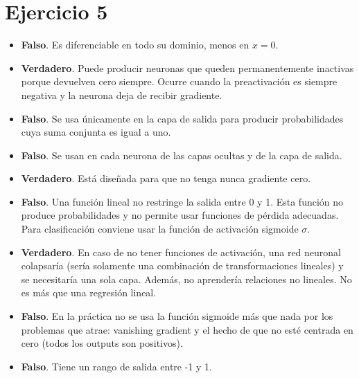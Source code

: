 \documentclass[12pt, a4paper]{article}
\begin{document}
    \section*{Ejercicio 5}
        \begin{itemize}
            \item \textbf{Falso}. Es diferenciable en todo su dominio, menos en \(x = 0\).
            \item \textbf{Verdadero}. Puede producir neuronas que queden permanentemente inactivas porque devuelven cero siempre. Ocurre cuando la preactivación es siempre negativa y la neurona deja de recibir gradiente.
            \item \textbf{Falso}. Se usa únicamente en la capa de salida para producir probabilidades cuya suma conjunta es igual a uno.
            \item \textbf{Falso}. Se usan en cada neurona de las capas ocultas y de la capa de salida.
            \item \textbf{Verdadero}. Está diseñada para que no tenga nunca gradiente cero.
            \item \textbf{Falso}. Una función lineal no restringe la salida entre 0 y 1. Esta función no produce probabilidades y no permite usar funciones de pérdida adecuadas. Para clasificación conviene usar la función de activación sigmoide $\sigma$.
            \item \textbf{Verdadero}. En caso de no tener funciones de activación, una red neuronal colapsaría (sería solamente una combinación de transformaciones lineales) y se necesitaría una sola capa. Además, no aprendería relaciones no lineales. No es más que una regresión lineal.
            \item \textbf{Falso}. En la práctica no se usa la función sigmoide más que nada por los problemas que atrae: vanishing gradient y el hecho de que no esté centrada en cero (todos los outputs son positivos).
            \item \textbf{Falso}. Tiene un rango de salida entre -1 y 1.
        \end{itemize}
\end{document}
